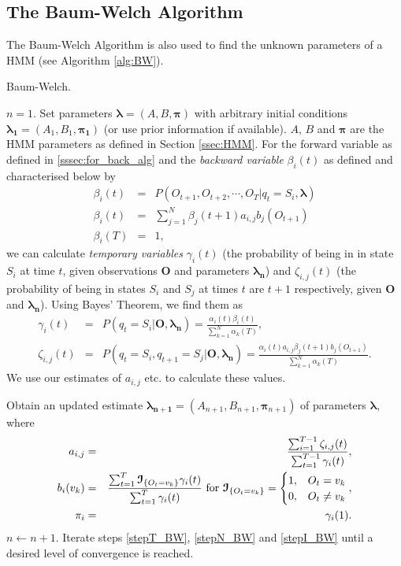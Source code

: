 \documentclass[12pt]{article}
\newcommand\I{{\cal I}}
\begin{document}
\subsection{The Baum-Welch Algorithm}\label{ssec:BW-Alg}
The Baum-Welch Algorithm is also used to find the unknown parameters of a HMM \cite{wu1983convergence} (see Algorithm \ref{alg:BW}).
\begin{algorithm}[h!]
\caption{Baum-Welch.}
\label{alg:BW}
\begin{algorithmic}[1] %
  \STATE $n=1$.
  \STATE Set parameters $\bm{\lambda}=(A,B,\bm{\pi})$ with arbitrary initial conditions $\bm{\lambda_1}=(A_1,B_1,\bm{\pi_1})$ (or use prior information if available). $A$, $B$ and $\bm{\pi}$ are the HMM parameters as defined in Section \ref{ssec:HMM}.
  \STATE For the forward variable as defined in \ref{sssec:for_back_alg} and the \emph{backward variable} $\beta_i(t)$ as defined and characterised below by
  \begin{eqnarray}
    \beta_i(t) &=& P(O_{t+1}, O_{t+2}, \cdots, O_T | q_t=S_i, \bm{\lambda}) \\
    \beta_i(t) &=& \sum_{j=1}^N \beta_j(t+1)a_{i,j}b_j(O_{t+1})\\
    \beta_i(T) &=& 1,
  \end{eqnarray}
  we can calculate \emph{temporary variables} $\gamma_i(t)$ (the probability of being in in state $S_i$ at time $t$, given observations $\bm{O}$ and parameters $\bm{\lambda_n}$) and $\zeta_{i,j}(t)$ (the probability of being in states $S_i$ and $S_j$ at times $t$ are $t+1$ respectively, given $\bm{O}$ and $\bm{\lambda_n}$). Using Bayes' Theorem, we find them as
  \begin{eqnarray}
    \gamma_i(t) &=& P(q_t=S_i|\bm{O},\bm{\lambda_n}) = \frac{\alpha_i(t)\beta_i(t)}{\sum_{k=1}^N\alpha_k(T)},\\
    \zeta_{i,j}(t) &=& P(q_t = S_i,q_{t+1}=S_j|\bm{O},\bm{\lambda_n}) = \frac{\alpha_i(t)a_{i,j}\beta_j(t+1)b_j(O_{t+1})}{\sum_{k=1}^N\alpha_k(T)}.
  \end{eqnarray}
  We use our estimates of $a_{i,j}$ etc. to calculate these values. \label{stepT_BW}
  
  \STATE Obtain an updated estimate $\bm{\lambda_{n+1}} = (A_{n+1},B_{n+1},\bm{\pi}_{n+1})$ of parameters $\bm{\lambda}$, where \label{stepN_BW}
  \begin{eqnarray}
    a_{i,j} &=& \frac{\sum_{i=1}^{T-1}\zeta_{i,j}(t)}{\sum_{t=1}^{T-1}\gamma_i(t)}, \\
    b_i(v_k) &=& \frac{\sum_{t=1}^T\bm{\I}_{\{O_t=v_k\}}\gamma_i(t)}{\sum_{t=1}^T\gamma_i(t)} \text{ for } \bm{\I}_{\{O_t=v_k\}}=\begin{cases} 
      1, & O_t=v_k \\
      0, & O_t\ne v_k
    \end{cases}, \\
    \pi_i &=& \gamma_i(1).
  \end{eqnarray}
  \STATE $n \leftarrow n+1$. \label{stepI_BW}
  \STATE Iterate steps \ref{stepT_BW}, \ref{stepN_BW} and \ref{stepI_BW} until a desired level of convergence is reached.
\end{algorithmic}
\end{algorithm}
\end{document}

